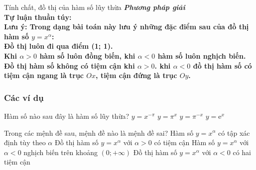 \begin{dang}{Tính chất, đồ thị của hàm số lũy thừa}
	\bfseries{\itshape{Phương pháp giải}}\\
	\bfseries{Tự luận thuần túy:}\\
	\bfseries{Lưu ý:} Trong dạng bài toán này lưu ý những đặc điểm sau của đồ thị hàm số $y=x^{\alpha}$:\\
	Đồ thị luôn đi qua điểm (1; 1).\\
	Khi $\alpha>0$ hàm số luôn đồng biến, khi $\alpha<0$ hàm số luôn nghịch biến.\\
	Đồ thị hàm số không có tiệm cận khi $\alpha>0$. khi $\alpha<0$ đồ thị hàm số có tiệm cận ngang là trục $Ox$, tiệm cận đứng là trục $Oy$.
\end{dang}
\subsubsection{Các ví dụ}
\begin{vd}%
	Hàm số nào sau đây là hàm số lũy thừa?
	\choice
	{\True $y=x^{-\pi}$}
	{$y=\pi^x$}
	{$y=\pi^{-x}$}
	{$y=\mathrm{e}^x$}
\end{vd}
\begin{vd}%
	Trong các mệnh đề sau, mệnh đề nào là mệnh đề sai?
	\choice
	{Hàm số $y=x^{\alpha}$ có tập xác định tùy theo $\alpha$}
	{\True Đồ thị hàm số $y=x^{\alpha}$ với $\alpha>0$ có tiệm cận}
	{Hàm số $y=x^{\alpha}$ với $\alpha<0$ nghịch biến trên khoảng $(0;+\infty)$}
	{Đồ thị hàm số $y=x^{\alpha}$ với $\alpha<0$ có hai tiệm cận}
\end{vd}
